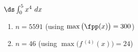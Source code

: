 {$\ds \int_{0}^{5} x^4 \ dx$}
{\begin{enumerate}
\item		$n=5591$ (using $\max\big(\fpp(x)\big)=300$)
\item		$n=46$	(using $\max\big(f\,^{(4)}(x)\big)=24$)
\end{enumerate}
}